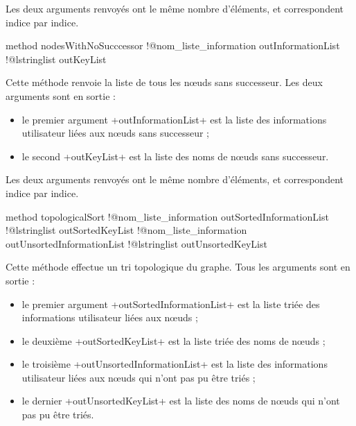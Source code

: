 Les deux arguments renvoyés ont le même nombre d'éléments, et correspondent indice par indice.







\begin{galgas}
method nodesWithNoSucccessor
  !@nom_liste_information outInformationList
  !@lstringlist outKeyList
\end{galgas}

Cette méthode renvoie la liste de tous les nœuds sans successeur. Les deux arguments sont en sortie :
\begin{itemize}
  \item le premier argument \ggs+outInformationList+ est la liste des informations utilisateur liées aux nœuds sans successeur ;
  \item le second \ggs+outKeyList+ est la liste des noms de nœuds sans successeur.
\end{itemize}

Les deux arguments renvoyés ont le même nombre d'éléments, et correspondent indice par indice.






\begin{galgas}
method topologicalSort
  !@nom_liste_information outSortedInformationList
  !@lstringlist outSortedKeyList
  !@nom_liste_information outUnsortedInformationList
  !@lstringlist outUnsortedKeyList
\end{galgas}

Cette méthode effectue un tri topologique du graphe. Tous les arguments sont en sortie :
\begin{itemize}
  \item le premier argument \ggs+outSortedInformationList+ est la liste triée des informations utilisateur liées aux nœuds ;
  \item le deuxième \ggs+outSortedKeyList+ est la liste triée des noms de nœuds ;
  \item le troisième \ggs+outUnsortedInformationList+ est la liste des informations utilisateur liées aux nœuds qui n'ont pas pu être triés ;
  \item le dernier \ggs+outUnsortedKeyList+ est la liste des noms de nœuds qui n'ont pas pu être triés.
\end{itemize}

